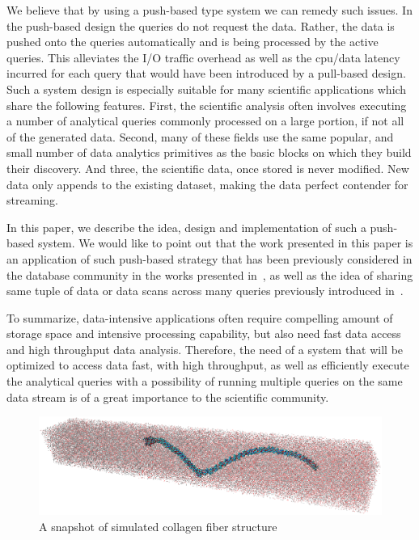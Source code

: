 \documentclass[10pt,journal,final,letterpaper,twocolumn]{IEEEtran}
\begin{document}
We believe that by using a push-based type system we can remedy such
issues. In the push-based design the queries do not request the
data. Rather, the data is pushed onto the queries automatically and
is being processed by the active queries. This alleviates the I/O
traffic overhead as well as the cpu/data latency incurred for each
query that would have been introduced by a pull-based design. Such a
system design is especially suitable for many scientific
applications which share the following features. First, the
scientific analysis often involves executing a number of analytical
queries commonly processed on a large portion, if not all of the
generated data. Second, many of these fields use the same popular,
and small number of data analytics primitives as the basic blocks on
which they build their discovery. And three, the scientific data,
once stored is never modified. New data only appends to the existing
dataset, making the data perfect contender for streaming.


In this paper, we describe the idea, design and implementation of
such a push-based system. We would like to point out that the work
presented in this paper is an application of such push-based
strategy that has been previously considered in the database
community in the works presented in~\cite{DataPath,Volcano,Qpipe},
as well as the idea of sharing same tuple of data or data scans
across many queries previously introduced
in~\cite{Candea,PredictablePerformance,CooperativeScans}.

To summarize, data-intensive applications often require compelling
amount of storage space and intensive processing capability, but
also need fast data access and high throughput data analysis.
Therefore, the need of a system that will be optimized to access
data fast, with high throughput, as well as efficiently execute the
analytical queries with a possibility of running multiple queries on
the same data stream is of a great importance to the scientific
community.

\begin{figure}
 \centerline{ \includegraphics[width=1\columnwidth]{images/snap-white.eps} }
 \caption{A snapshot of simulated collagen fiber structure}
 \label{fg:snap-white}
\end{figure}
\end{document}
